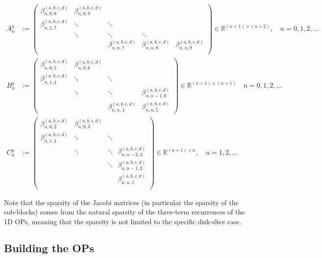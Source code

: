 \documentclass[11pt, oneside]{article}   	%
\newcommand{\R}{\mathbb{R}}
\newcommand{\betaabcd}{\beta^{(a,b,c,d)}}
\begin{document}
\begin{align*}
A^y_n &:= \begin{pmatrix}
		\betaabcd_{n,0,8} & \betaabcd_{n,0,9} & & & \\
		\betaabcd_{n,1,7}& \ddots & \ddots & & \\
		& \ddots & \ddots & \ddots & \\
		& & \betaabcd_{n,n,7} & \betaabcd_{n,n,8} & \betaabcd_{n,n,9} \\
	    \end{pmatrix} \in \R^{(n+1)\times(n+2)}, \quad n = 0,1,2,\dots \\
B^y_n &:= \begin{pmatrix}
		\betaabcd_{n,0,5} & \betaabcd_{n,0,6} & & \\
		\betaabcd_{n,1,4} & \ddots & \ddots & \\
		& \ddots & \ddots & \betaabcd_{n,n-1,6} \\
		& & \betaabcd_{n,n,4} & \betaabcd_{n,n,5}
	    \end{pmatrix} \in \R^{(n+1)\times(n+1)}  \quad n = 0,1,2,\dots \\
C^y_n &:= \begin{pmatrix}
		\betaabcd_{n,0,2} & \betaabcd_{n,0,3} & & \\
		\betaabcd_{n,1,1} & \ddots & \ddots & \\
		& \ddots & \ddots & \betaabcd_{n,n-2,3} \\
		& & \ddots & \betaabcd_{n,n-1,2} \\
		& & & \betaabcd_{n,n,1} \\
	    \end{pmatrix} \in \R^{(n+1)\times n}, \quad n = 1,2,\dots
\end{align*}

Note that the sparsity of the Jacobi matrices (in particular the sparsity of the sub-blocks) comes from the natural sparsity of the three-term recurrences of the 1D OPs, meaning that the sparsity is not limited to the specific disk-slice case.




\subsection{Building the OPs} 
\end{document}
